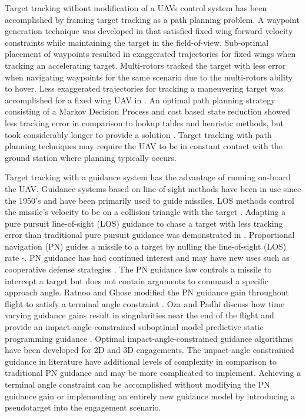 \documentclass[conference]{IEEEtran}
\begin{document}
Target tracking without modification of a UAVs control system has been accomplished by framing target tracking as a path planning problem. A waypoint generation technique was developed in \cite{ariyur_autonomous_2008} that satisfied fixed wing forward velocity constraints while maintaining the target in the field-of-view. Sub-optimal placement of waypoints resulted in exaggerated trajectories for fixed wings when tracking an accelerating target. Multi-rotors tracked the target with less error when navigating waypoints for the same scenario due to the multi-rotors ability to hover. Less exaggerated trajectories for tracking a maneuvering target was accomplished for a fixed wing UAV in \cite{lee_strategies_2003}.  An optimal path planning strategy consisting of a Markov Decision Process and cost based state reduction showed less tracking error in comparison to lookup tables and heuristic methods, but took considerably longer to provide a solution \cite{baek_optimal_2013}. Target tracking with path planning techniques may require the UAV to be in constant contact with the ground station where planning typically occurs.  

Target tracking with a guidance system has the advantage of running on-board the UAV.  Guidance systems based on line-of-sight methods have been in use since the 1950’s \cite{zarchan} and have been primarily used to guide missiles. LOS methods control the missile’s velocity to be on a collision triangle with the target \cite{shneydor1998missile,yanushevsky2007modern}. Adapting a pure pursuit line-of-sight (LOS) guidance to chase a target with less tracking error than traditional pure pursuit guidance was demonstrated in \cite{yamasaki_advanced_2009}.  Proportional navigation (PN) guides a missile to a target by nulling the line-of-sight (LOS) rate \cite{shneydor1998missile}-\cite{yanushevsky2007modern}. PN guidance has had continued interest and may have new uses such as cooperative defense strategies \cite{isaac}. The PN guidance law controls a missile to intercept a target but does not contain arguments to command a specific approach angle. Ratnoo and Ghose modified the PN guidance gain throughout flight to satisfy a terminal angle constraint \cite{ratnoo2009satisfying}. Oza and Padhi discuss how time varying guidance gains result in singularities near the end of the flight and provide an impact-angle-constrained suboptimal model predictive static programming guidance \cite{oza2012impact}. Optimal impact-angle-constrained guidance algorithms have been developed for 2D \cite{park2013optimal} and 3D \cite{kumar2014three} engagements. The impact-angle constrained guidance in literature have additional levels of complexity in comparison to traditional PN guidance and may be more complicated to implement. Achieving a terminal angle constraint can be accomplished without modifying the PN guidance gain or implementing an entirely new guidance model by introducing a pseudotarget into the engagement scenario.
\end{document}
